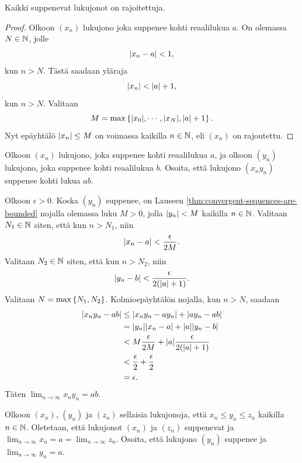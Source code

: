 \documentclass[12pt,a4paper]{article}
\begin{document}
\begin{theorem}\label{thm:convergent-sequences-are-bounded}
  Kaikki suppenevat lukujonot on rajoitettuja.
\end{theorem}

\begin{proof}
  Olkoon \((x_n)\) lukujono joka suppenee kohti reaalilukua \(a\). On
  olemassa \(N \in \mathbb{N}\), jolle
  \[
    \lvert x_n - a\rvert < 1,
  \]
  kun \(n > N\). Tästä saadaan yläraja
  \[
    \lvert x_n\rvert < \lvert a\rvert + 1,
  \]
  kun \(n > N\). Valitaan
  \[
    M = \max\left\lbrace\lvert x_0\rvert, \cdots, \lvert x_N\rvert, \lvert a\rvert + 1\right\rbrace.
  \]
  Nyt epäyhtälö \(\lvert x_n\rvert \leq M\) on voimassa kaikilla \(n \in \mathbb{N}\),
  eli \((x_n)\) on rajoutettu.
\end{proof}

\begin{exercise}
  Olkoon \((x_n)\) lukujono, joka suppenee kohti reaalilukua \(a\), ja
  olkoon \((y_n)\) lukujono, joka suppenee kohti reaalilukua \(b\).
  Osoita, että lukujono \((x_ny_n)\) suppenee kohti lukua \(ab\).
\end{exercise}

\begin{solution}
  Olkoon \(\epsilon > 0\). Koska \((y_n)\) suppenee, on Lauseen
  \ref{thm:convergent-sequences-are-bounded} nojalla olemassa luku
  \(M > 0\), jolla \(\lvert y_n\rvert < M\) kaikilla \(n \in \mathbb{N}\). Valitaan
  \(N_1 \in \mathbb{N}\) siten, että kun \(n > N_1\), niin
  \[
    \lvert x_n - a\rvert < \frac{\epsilon}{2M}.
  \]
  Valitaan \(N_2 \in \mathbb{N}\) siten, että kun \(n > N_2\), niin
  \[
    \lvert y_n - b\rvert < \frac{\epsilon}{2(\lvert a\rvert + 1)}.
  \]
  Valitaan \(N = \max\left\lbrace N_1, N_2\right\rbrace\). Kolmioepäyhtälön nojalla,
  kun \(n > N\), saadaan
  \[
    \begin{aligned}
      \lvert x_ny_n - ab\rvert &\leq \lvert x_ny_n - ay_n\rvert + \lvert ay_n - ab\rvert \\
      &= \lvert y_n\rvert\lvert x_n - a\rvert + \lvert a\rvert\lvert y_n - b\rvert \\
      &< M\frac{\epsilon}{2M} + \lvert a\rvert\frac{\epsilon}{2(\lvert a\rvert + 1)} \\
      &< \frac{\epsilon}{2} + \frac{\epsilon}{2} \\
      &= \epsilon.
    \end{aligned}
  \]
  Täten \(\lim_{n \to \infty} x_ny_n = ab\).
\end{solution}

\begin{exercise}
  Olkoon \((x_n)\), \((y_n)\) ja \((z_n)\) sellaisia lukujonoja, että
  \(x_n \leq y_n \leq z_n\) kaikilla \(n \in \mathbb{N}\). Oletetaan, että
  lukujonot \((x_n)\) ja \((z_n)\) suppenevat ja
  \(\lim_{n \to \infty} x_n = a = \lim_{n \to \infty} z_n\).
  Osoita, että lukujono \((y_n)\) suppenee ja \(\lim_{n \to \infty} y_n = a\).
\end{exercise}
\end{document}
